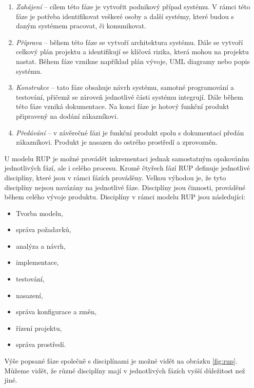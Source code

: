 \documentclass[czech,master,public,dept460,male,cpdeclaration,oneside]{diploma}
\begin{document}
\begin{enumerate}
\item \textit{Zahájení} -- cílem této fáze je vytvořit podnikový případ systému. V rámci této fáze je potřeba identifikovat veškeré osoby a další systémy, které budou s daným systémem pracovat, či komunikovat.
\item \textit{Příprava} -- během této fáze se vytvoří architektura systému. Dále se vytvoří celkový plán projektu a identifikují se klíčová rizika, která mohou na projektu nastat. Během fáze vznikne například plán vývoje, UML diagramy nebo popis systému.
\item \textit{Konstrukce} -- tato fáze obsahuje návrh systému, samotné programování a testování, přičemž se zároveň jednotlivé části systému integrují. Dále během této fáze vzniká dokumentace. Na konci fáze je hotový funkční produkt připravený na dodání zákazníkovi.
\item \textit{Předávání} -- v závěrečné fázi je funkční produkt spolu s dokumentací předán zákazníkovi. Produkt je nasazen do ostrého prostředí a zprovozněn.
\end{enumerate}

U modelu RUP je možné provádět inkrementaci jednak samostatným opakováním jednotlivých fází, ale i celého procesu. Kromě čtyřech fází RUP definuje jednotlivé disciplíny, které jsou v rámci fázích prováděny. Velkou výhodou je, že tyto disciplíny nejsou navázány na jednotlivé fáze. Disciplíny jsou činnosti, prováděné během celého vývoje produktu. Disciplíny v rámci modelu RUP jsou následující:

\begin{itemize}
\item Tvorba modelu,
\item správa požadavků,
\item analýza a návrh,
\item implementace,
\item testování,
\item nasazení,
\item správa konfigurace a změn,
\item řízení projektu,
\item správa prostředí.
\end{itemize}

Výše popsané fáze společně s disciplínami je možné vidět na obrázku \ref{fig:rup}. Můžeme vidět, že různé disciplíny mají v jednotlivých fázích vyšší důležitost než jiné.
\end{document}

